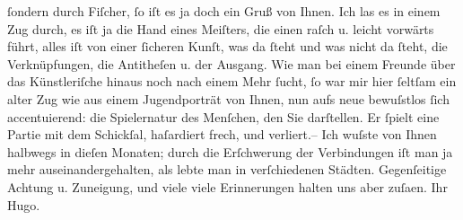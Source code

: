 \begin{ledgroupsized}[t]{13cm}
               ſondern durch Fiſcher, ſo iſt es ja doch ein Gruß
               von Ihnen. Ich las es in einem Zug durch, es iſt ja die Hand eines Meiſters, die
               einen raſch u. leicht vorwärts führt, alles iſt von einer ſicheren Kunſt, was da
               ſteht und was nicht da ſteht, die Verknüpfungen, die Antitheſen u. der Ausgang. Wie
               man bei einem Freunde über das Künstleriſche hinaus noch nach {\pb}einem Mehr ſucht, ſo war mir hier
               ſeltſam ein alter Zug wie aus einem Jugendporträt von Ihnen, nun aufs neue bewuſstlos
               ſich accentuierend: die Spielernatur des Menſchen, den Sie darſtellen. Er ſpielt eine
               Partie mit dem Schickſal, haſardiert frech, und verliert.\hspace*{1.5em}– Ich wuſste von Ihnen halbwegs in dieſen Monaten; durch die
               Erſchwerung der Verbindungen iſt man ja mehr auseinandergehalten, als lebte man in
               verſchiedenen Städten. Gegenſeitige Achtung u. Zuneigung, und viele viele
               Erinnerungen halten uns aber zuſa{\geminationm}en.\pend
           \pstart Ihr \spacefill\mbox{Hugo.}\pend{}\endnumbering{}\end{ledgroupsized}  \newcommand{\dateiname}{L02297}\newcommand{\titel}{Hugo von Hofmannsthal an Arthur Schnitzler, 17. 8. [1918]}\newcommand{\editorInnen}{Martin Anton Müller und Gerd-Hermann Susen}
      